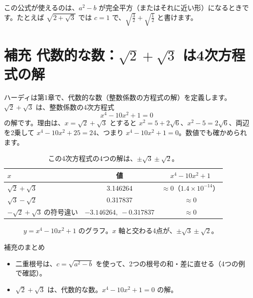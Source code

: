\documentclass[a4paper,11pt,openany]{ltjsbook}
\begin{document}
この公式が使えるのは、$a^2-b$ が完全平方（またはそれに近い形）になるときです。たとえば $\sqrt{2+\sqrt3}$ では $c=1$ で、$\sqrt{\tfrac32}+\sqrt{\tfrac12}$ と書けます。

\section{補充 代数的な数：$\sqrt2+\sqrt3$ は4次方程式の解}

ハーディは第1章で、代数的な数（整数係数の方程式の解）を定義します。$\sqrt2+\sqrt3$ は、整数係数の4次方程式
\[
x^4-10x^2+1=0
\]
の解です。理由は、$x=\sqrt2+\sqrt3$ とすると $x^2=5+2\sqrt6$、$x^2-5=2\sqrt6$、両辺を2乗して $x^4-10x^2+25=24$、つまり $x^4-10x^2+1=0$。数値でも確かめられます。

\begin{table}[htbp]
\centering
\begin{tabular}{lcc}
\toprule
$x$ & 値 & $x^4-10x^2+1$\\
\midrule
$\sqrt2+\sqrt3$ & 3.146264 & $\approx0$（$1.4\times10^{-14}$）\\
$\sqrt3-\sqrt2$ & 0.317837 & $\approx0$\\
$-\sqrt2+\sqrt3\ $の符号違い & $-3.146264,\ -0.317837$ & $\approx0$\\
\bottomrule
\end{tabular}
\caption{この4次方程式の4つの解は、$\pm\sqrt3\pm\sqrt2$。}
\end{table}

\begin{figure}[htbp]
\centering
{}
\caption{$y=x^4-10x^2+1$ のグラフ。$x$ 軸と交わる4点が、$\pm\sqrt3\pm\sqrt2$。}
\end{figure}

\begin{pointbox}{補充のまとめ}
\begin{itemize}[leftmargin=*]
\item 二重根号は、$c=\sqrt{a^2-b}$ を使って、2つの根号の和・差に直せる（4つの例で確認）。
\item $\sqrt2+\sqrt3$ は、代数的な数。$x^4-10x^2+1=0$ の解。
\end{itemize}
\end{pointbox}
\end{document}
